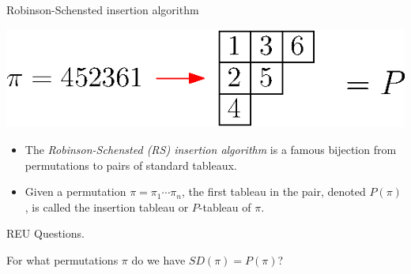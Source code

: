 \documentclass[aspectratio=169, serif]{beamer}
\begin{document}
\begin{frame}{Robinson-Schensted insertion algorithm}
        \begin{center}
            \includegraphics[scale = 0.8]{RS_Example.eps}
        \end{center}
\begin{itemize}        
\item The \textit{Robinson-Schensted (RS) insertion algorithm} is a famous 
bijection from permutations to pairs of standard tableaux. 
\item Given a permutation $\pi = \pi_1\cdots\pi_n$, 
the first tableau in the pair, denoted $P(\pi)$, is called the insertion tableau or $P$-tableau of $\pi$. 
\end{itemize} 
        
    
        \begin{block}{REU Questions.}
    
     For what permutations $\pi$ do we have  $SD(\pi)=P(\pi)$?
    
    \end{block}
    
\end{frame}
\end{document}

